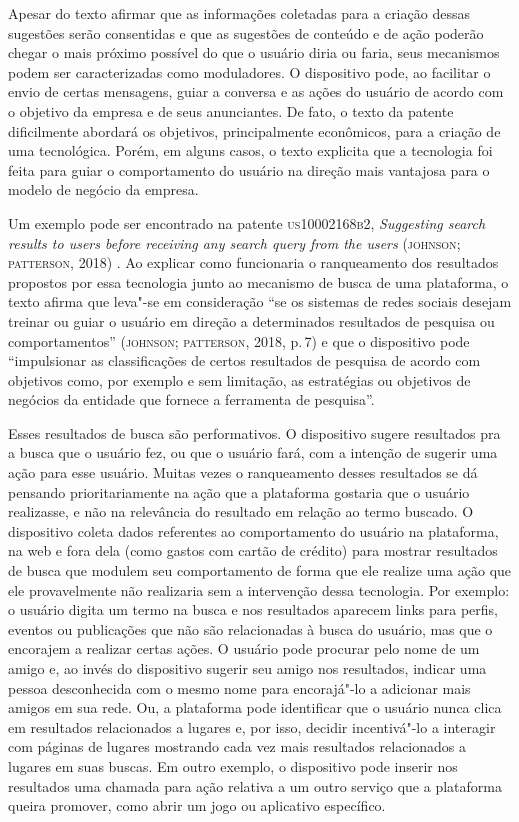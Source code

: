 Apesar do texto afirmar que as informações coletadas para a criação
dessas sugestões serão consentidas e que as sugestões de conteúdo e de
ação poderão chegar o mais próximo possível do que o usuário diria ou
faria, seus mecanismos podem ser caracterizadas como moduladores. O
dispositivo pode, ao facilitar o envio de certas mensagens, guiar a
conversa e as ações do usuário de acordo com o objetivo da empresa e de
seus anunciantes. De fato, o texto da patente dificilmente abordará os
objetivos, principalmente econômicos, para a criação de uma tecnológica.
Porém, em alguns casos, o texto explicita que a tecnologia foi feita
para guiar o comportamento do usuário na direção mais vantajosa para o
modelo de negócio da empresa.

Um exemplo pode ser encontrado na patente \textsc{us10002168b2}, \textit{Suggesting
search results to users before receiving any search query from the
users} (\textsc{johnson}; \textsc{patterson}, 2018) . Ao explicar como funcionaria o
ranqueamento dos resultados propostos por essa tecnologia junto ao
mecanismo de busca de uma plataforma, o texto afirma que leva"-se em
consideração ``se os sistemas de redes sociais desejam treinar ou guiar
o usuário em direção a determinados resultados de pesquisa ou
comportamentos'' (\textsc{johnson}; \textsc{patterson}, 2018, p.\,7) e que o
dispositivo pode ``impulsionar as classificações de certos resultados de
pesquisa de acordo com objetivos como, por exemplo e sem limitação, as
estratégias ou objetivos de negócios da entidade que fornece a
ferramenta de pesquisa''.

Esses resultados de busca são performativos. O dispositivo sugere resultados pra a busca que
o usuário fez, ou que o usuário fará, com a intenção de sugerir uma ação
para esse usuário. Muitas vezes o ranqueamento desses resultados se dá
pensando prioritariamente na ação que a plataforma gostaria que o
usuário realizasse, e não na relevância do resultado em relação ao termo
buscado. O dispositivo coleta dados referentes ao comportamento do
usuário na plataforma, na web e fora dela (como gastos com cartão de
crédito) para mostrar resultados de busca que modulem seu comportamento
de forma que ele realize uma ação que ele provavelmente não realizaria
sem a intervenção dessa tecnologia. Por exemplo: o usuário digita um
termo na busca e nos resultados aparecem links para perfis, eventos ou
publicações que não são relacionadas à busca do usuário, mas que o
encorajem a realizar certas ações. O usuário pode procurar pelo nome de
um amigo e, ao invés do dispositivo sugerir seu amigo nos resultados,
indicar uma pessoa desconhecida com o mesmo nome para encorajá"-lo a
adicionar mais amigos em sua rede. Ou, a plataforma pode identificar que
o usuário nunca clica em resultados relacionados a lugares e, por isso,
decidir incentivá"-lo a interagir com páginas de lugares mostrando cada
vez mais resultados relacionados a lugares em suas buscas. Em outro
exemplo, o dispositivo pode inserir nos resultados uma chamada para ação
relativa a um outro serviço que a plataforma queira promover, como abrir
um jogo ou aplicativo específico.

